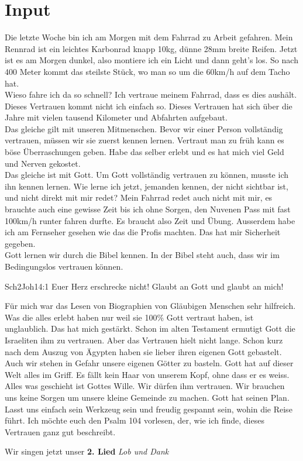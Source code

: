 \documentclass{../inc/mybib}
\begin{document}
\section{ Input }
\begin{spacing}{1.5}
Die letzte Woche bin ich am Morgen mit dem Fahrrad zu Arbeit gefahren. Mein Rennrad ist ein leichtes Karbonrad knapp 10kg, dünne 28mm breite Reifen. Jetzt ist es am Morgen dunkel, also montiere ich ein Licht und dann geht's los. So nach 400 Meter kommt das steilste Stück, wo man so um die 60km/h auf dem Tacho hat. \\
Wieso fahre ich da so schnell? Ich vertraue meinem Fahrrad, dass es dies aushält. Dieses Vertrauen kommt nicht ich einfach so. Dieses Vertrauen hat sich über die Jahre mit vielen tausend Kilometer und Abfahrten aufgebaut. \\
Das gleiche gilt mit unseren Mitmenschen. Bevor wir einer Person vollständig vertrauen, müssen wir sie zuerst kennen lernen. Vertraut man zu früh kann es böse Überraschungen geben. Habe das selber erlebt und es hat mich viel Geld und Nerven gekostet.  \\
Das gleiche ist mit Gott. Um Gott vollständig vertrauen zu können, musste ich ihn kennen lernen. Wie lerne ich jetzt, jemanden kennen, der nicht sichtbar ist, und nicht direkt mit mir redet? Mein Fahrrad redet auch nicht mit mir, es brauchte auch eine gewisse Zeit bis ich ohne Sorgen, den Nuvenen Pass mit fast 100km/h runter fahren durfte. Es braucht also Zeit und Übung. Ausserdem habe ich am Fernseher gesehen wie das die Profis machten. Das hat mir Sicherheit gegeben. \\
Gott lernen wir durch die Bibel kennen. In der Bibel steht auch, dass wir im Bedingungslos vertrauen können.
\begin{bibeltext}{Sch2}{Joh}{14:1}
Euer Herz erschrecke nicht! Glaubt an Gott und glaubt an mich!
\end{bibeltext}
Für mich war das Lesen von Biographien von Gläubigen Menschen sehr hilfreich. Was die alles erlebt haben nur weil sie 100\% Gott vertraut haben, ist unglaublich. Das hat mich gestärkt.
Schon im alten Testament ermutigt Gott die Israeliten ihm zu vertrauen. Aber das Vertrauen hielt nicht lange. Schon kurz nach dem Auszug von Ägypten haben sie lieber ihren eigenen Gott gebastelt. \\
Auch wir stehen in Gefahr unsere eigenen Götter zu basteln. Gott hat auf dieser Welt alles im Griff. Es fällt kein Haar von unserem Kopf, ohne dass er es weiss. Alles was geschieht ist Gottes Wille. Wir dürfen ihm vertrauen. Wir brauchen uns keine Sorgen um unsere kleine Gemeinde zu machen. Gott hat seinen Plan. Lasst uns einfach sein Werkzeug sein und freudig gespannt sein, wohin die Reise führt.
Ich möchte euch den Psalm 104 vorlesen, der, wie ich finde, dieses Vertrauen ganz gut beschreibt.

\end{spacing}
Wir singen jetzt unser \textbf{2. Lied} \textit{Lob und Dank}
\end{document}
